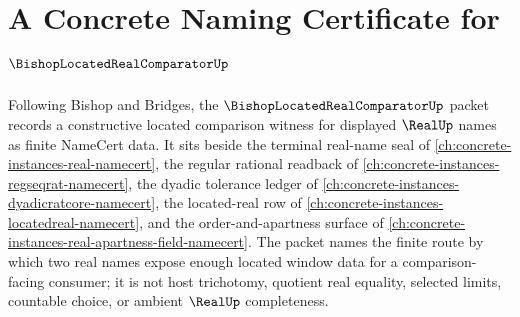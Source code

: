 \chapter{A Concrete Naming Certificate for $\BishopLocatedRealComparatorUp$}
\label{ch:concrete-instances-bishop-located-real-comparator-namecert}

Following Bishop and Bridges, the $\BishopLocatedRealComparatorUp$ packet records a constructive located comparison witness for displayed $\RealUp$ names as finite NameCert data. It sits beside the terminal real-name seal of \autoref{ch:concrete-instances-real-namecert}, the regular rational readback of \autoref{ch:concrete-instances-regseqrat-namecert}, the dyadic tolerance ledger of \autoref{ch:concrete-instances-dyadicratcore-namecert}, the located-real row of \autoref{ch:concrete-instances-locatedreal-namecert}, and the order-and-apartness surface of \autoref{ch:concrete-instances-real-apartness-field-namecert}. The packet names the finite route by which two real names expose enough located window data for a comparison-facing consumer; it is not host trichotomy, quotient real equality, selected limits, countable choice, or ambient $\RealUp$ completeness.

